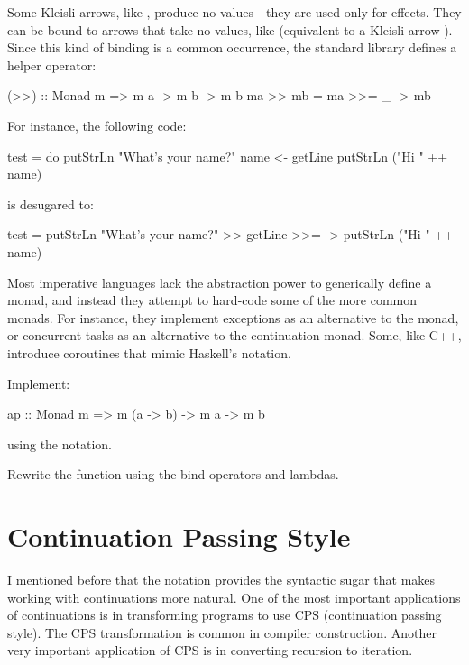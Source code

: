 \documentclass[DaoFP]{subfiles}
\begin{document}
Some Kleisli arrows, like , produce no values---they are used only for effects. They can be bound to arrows that take no values, like  (equivalent to a Kleisli arrow ). Since this kind of binding is a common occurrence, the standard library defines a helper operator:
\begin{haskell}
(>>) :: Monad m => m a -> m b -> m b
ma >> mb = ma >>= \_ -> mb 
\end{haskell}
For instance, the following code:
\begin{haskell}
test = do
  putStrLn "What's your name?"
  name <- getLine
  putStrLn ("Hi " ++ name)
\end{haskell}
is desugared to:
\begin{haskell}
test =
  putStrLn "What's your name?" >> 
    getLine >>= \name ->
      putStrLn ("Hi " ++ name)
\end{haskell}


Most imperative languages lack the abstraction power to generically define a monad, and instead they attempt to hard-code some of the more common monads. For instance, they implement exceptions as an alternative to the  monad, or concurrent tasks as an alternative to the continuation monad. Some, like C++, introduce coroutines that mimic Haskell's  notation. 

\begin{exercise}
Implement:
\begin{haskell}
ap :: Monad m => m (a -> b) -> m a -> m b
\end{haskell}
using the  notation.
\end{exercise}

\begin{exercise}
Rewrite the  function using the bind operators and lambdas.
\end{exercise}

\section{Continuation Passing Style}

I mentioned before that the  notation provides the syntactic sugar that makes working with continuations more natural. One of the most important applications of continuations is in transforming programs to use CPS (continuation passing style). The CPS transformation is common in compiler construction. Another very important application of CPS is in converting recursion to iteration. 
\end{document}
